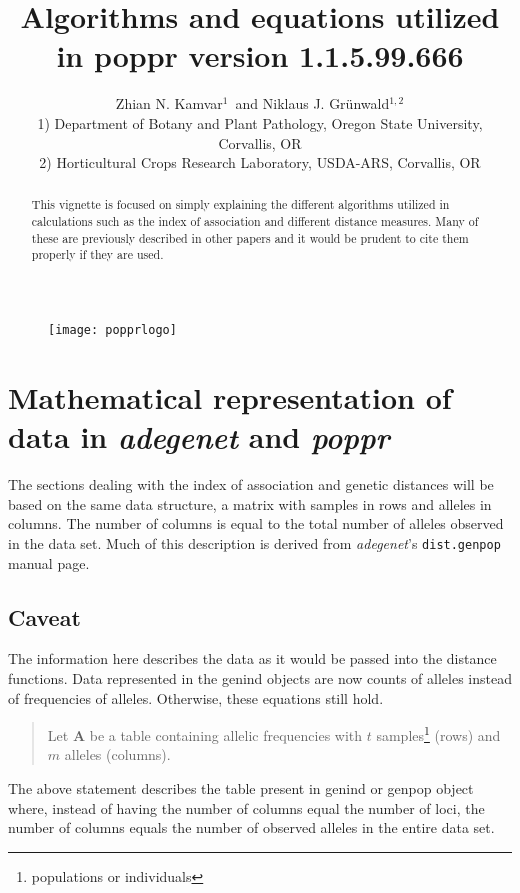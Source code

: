 \documentclass[letterpaper]{article}\usepackage[]{graphicx}\usepackage[]{color}
\title{Algorithms and equations utilized in poppr version 1.1.5.99.666}
\author{Zhian N. Kamvar$^{1}$\ and Niklaus J. Gr\"unwald$^{1,2}$\\\scriptsize{1)
Department of Botany and Plant Pathology, Oregon State University, Corvallis,
OR}\\\scriptsize{2) Horticultural Crops Research Laboratory, USDA-ARS,
Corvallis, OR}}
\newcommand{\poppr}{\textit{poppr}}
\newcommand{\adegenet}{\textit{adegenet}}
\begin{document}
\maketitle

\begin{abstract}
This vignette is focused on simply explaining the different algorithms utilized
in calculations such as the index of association and different distance measures.
Many of these are previously described in other papers and it would be prudent
to cite them properly if they are used.
\end{abstract}

\begin{figure}[b]   
  \centering
  \label{logo}   
  \texttt{[image: popprlogo]} 
\end{figure} 

\newpage 
\begingroup
  \hypersetup{linkcolor=black} 
  \tableofcontents 
\endgroup 

\section{Mathematical representation of data in \adegenet{} and \poppr{}}

The sections dealing with the index of association and genetic distances will be
based on the same data structure, a matrix with samples in rows and alleles in
columns. The number of columns is equal to the total number of alleles observed
in the data set. Much of this description is derived from \adegenet{}'s
\texttt{dist.genpop} manual page.

\subsection{Caveat}

The information here describes the data as it would be passed into the distance
functions. Data represented in the genind objects are now counts of alleles
instead of frequencies of alleles. Otherwise, these equations still hold. 

\begin{quote}
Let \textbf{A} be a table containing allelic frequencies with $t$
samples\footnote{populations or individuals} (rows) and $m$ alleles (columns).\\
\end{quote}
The above statement describes the table present in genind or genpop object
where, instead of having the number of columns equal the number of loci, the
number of columns equals the number of observed alleles in the entire data set.
\end{document}
